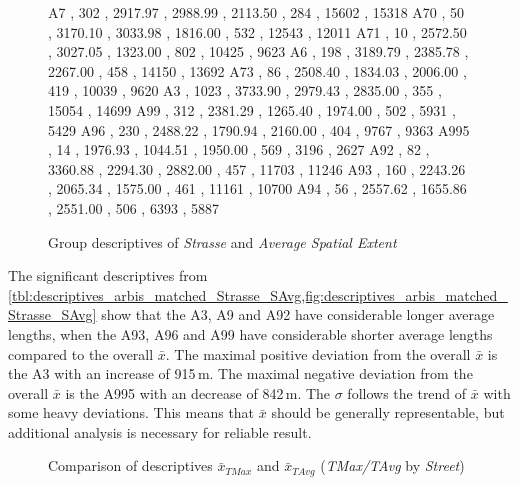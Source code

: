 \begin{figure}[ht!]
\begin{minipage}{0.55\textwidth}
{			A7   , 302  , 2917.97 , 2988.99 , 2113.50 , 284 , 15602 , 15318 
			A70  , 50   , 3170.10 , 3033.98 , 1816.00 , 532 , 12543 , 12011 
			A71  , 10   , 2572.50 , 3027.05 , 1323.00 , 802 , 10425 , 9623  
			A6   , 198  , 3189.79 , 2385.78 , 2267.00 , 458 , 14150 , 13692 
			A73  , 86   , 2508.40 , 1834.03 , 2006.00 , 419 , 10039 , 9620  
			A3   , 1023 , 3733.90 , 2979.43 , 2835.00 , 355 , 15054 , 14699 
			A99  , 312  , 2381.29 , 1265.40 , 1974.00 , 502 , 5931  , 5429  
			A96  , 230  , 2488.22 , 1790.94 , 2160.00 , 404 , 9767  , 9363  
			A995 , 14   , 1976.93 , 1044.51 , 1950.00 , 569 , 3196  , 2627  
			A92  , 82   , 3360.88 , 2294.30 , 2882.00 , 457 , 11703 , 11246 
			A93  , 160  , 2243.26 , 2065.34 , 1575.00 , 461 , 11161 , 10700  
			A94  , 56   , 2557.62 , 1655.86 , 2551.00 , 506 , 6393  , 5887  
		}\data
		\pgfplotstablesort[sort key=mean, sort cmp=float >]{\datasorted}{\data}
		\tiny
		\centering
		\label{fig:descriptives_arbis_matched_Strasse_SAvg}
	\end{minipage}%
	\caption{Group descriptives of \textit{Strasse} and \textit{Average Spatial Extent}}
\end{figure}
The significant descriptives from \cref{tbl:descriptives_arbis_matched_Strasse_SAvg,fig:descriptives_arbis_matched_Strasse_SAvg} show that the A3, A9 and A92 have considerable longer average lengths, when the A93, A96 and A99 have considerable shorter average lengths compared to the overall $\bar{x}$. The maximal positive deviation from the overall $\bar{x}$ is the A3 with an increase of 915\,m. The maximal negative deviation from the overall $\bar{x}$ is the A995 with an decrease of 842\,m. The $\sigma$ follows the trend of $\bar{x}$ with some heavy deviations. This means that $\bar{x}$ should be generally representable, but additional analysis is necessary for reliable result.
\begin{figure}[ht!]
	\data
	\pgfplotstablesort[sort key=meanTAvg, sort cmp=float >]{\datasorted}{\data}
	\tiny
	\centering
	\caption{Comparison of descriptives $\bar{x}_{TMax}$ and $\bar{x}_{TAvg}$ (\textit{TMax/TAvg} by \textit{Street})}
	\label{fig:arbis_matched_meancomparison_Str_spatial}
\end{figure}
